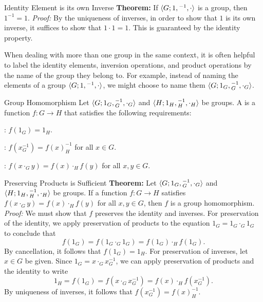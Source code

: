 \documentclass[12pt]{report}
\begin{document}
\begin{thmbox}{Identity Element is its own Inverse}
	\textbf{Theorem:} If ${\langle {G; 1, {}^{-1}, \cdot} \rangle}$ is a group, then $1^{-1} = 1$.
\tcblower
	\textit{Proof:} By the uniqueness of inverses, in order to show that $1$ is its own inverse, it suffices to show that $1 \cdot 1 = 1$. This is guaranteed by the identity property.
\end{thmbox}

When dealing with more than one group in the same context, it is often helpful to label the identity elements, inversion operations, and product operations by the name of the group they belong to. For example, instead of naming the elements of a group ${\langle {G; 1, {}^{-1}, \cdot} \rangle}$, we might choose to name them ${\langle {G; 1_G, {}^{-1}_G, \cdot_G} \rangle}$.

\begin{dfnbox}{Group Homomorphism}
	Let ${\langle {G; 1_G, {}^{-1}_G, \cdot_G} \rangle}$ and ${\langle {H; 1_H, {}^{-1}_H, \cdot_H} \rangle}$ be groups. A  is a function $f: G \to H$ that satisfies the following requirements:
	\begin{dfnitems}
		\item {}: $f(1_G) = 1_H$.
		\item {}: $f(x^{-1}_G) = f(x)^{-1}_H$ for all $x \in G$.
		\item {}: $f(x \cdot_G y) = f(x) \cdot_H f(y)$ for all $x, y \in G$.
	\end{dfnitems}
\end{dfnbox}

\begin{thmbox}{Preserving Products is Sufficient}
	\textbf{Theorem:} Let ${\langle {G; 1_G, {}^{-1}_G, \cdot_G} \rangle}$ and ${\langle {H; 1_H, {}^{-1}_H, \cdot_H} \rangle}$ be groups. If a function $f: G \to H$ satisfies $f(x \cdot_G y) = f(x) \cdot_H f(y)$ for all $x, y \in G$, then $f$ is a group homomorphism.
\tcblower
	\textit{Proof:} We must show that $f$ preserves the identity and inverses. For preservation of the identity, we apply preservation of products to the equation $1_G = 1_G \cdot_G 1_G$ to conclude that
	\[ f(1_G) = f(1_G \cdot_G 1_G) = f(1_G) \cdot_H f(1_G). \]
	By cancellation, it follows that $f(1_G) = 1_H$. For preservation of inverses, let $x \in G$ be given. Since $1_G = x \cdot_G x^{-1}_G$, we can apply preservation of products and the identity to write
	\[ 1_H = f(1_G) = f(x \cdot_G x^{-1}_G) = f(x) \cdot_H f(x^{-1}_G). \]
	By uniqueness of inverses, it follows that $f(x^{-1}_G) = f(x)^{-1}_H$.
\end{thmbox}
\end{document}
